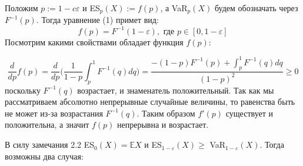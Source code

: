 \documentclass[12pt]{article}
\theoremstyle{plain}
\theoremstyle{definition}
\theoremstyle{remark}
\begin{document}
Положим $p:=1-c\varepsilon$ и ES$_p(X) := f(p)$, а VaR$_p(X)$ будем обозначать через $F^{-1}(p)$. Тогда уравнение (1) примет вид:
\[
f(p)= F^{-1}(1-\varepsilon), \text{ где } p \in [0, 1-\varepsilon]
\]
Посмотрим какими свойствами обладает функция $f(p):$

\[
    \frac{d}{dp}f(p)=\frac{d}{dp}\bigg(\frac{1}{1-p}\int_p^1F^{-1}(q)dq\bigg)= \frac{-(1-p)F^{-1}(p)+\int_p^1F^{-1}(q)dq}{(1-p)^2}\geq 0 
\]
поскольку $F^{-1}(q)$ возрастает, и знаменатель положительный. Так как мы рассматриваем абсолютно непрерывные случайные величины, то равенства быть не может из-за возрастания $F^{-1}(q)$. Таким образом $f'(p)$ существует и положительна, а значит $f(p)$ непрерывна и возрастает.

В силу замечания 2.2 ES$_0(X) = \mathbb{E}X$ и ES$_{1-\varepsilon}(X) \geq$ VaR$_{1-\varepsilon}(X)$. Тогда возможны два случая:  
\end{document}

